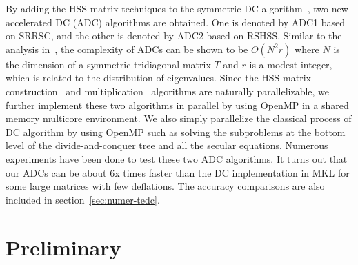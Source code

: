 \documentclass[times]{nlaauth}
\newcounter{algorithm}
\begin{document}
  By adding the HSS matrix techniques to the symmetric DC algorithm~\cite{Cuppen81,Rutter94,Gu-eigenvalue},
  two new accelerated DC (ADC) algorithms are obtained. One is denoted by {ADC1} based on SRRSC,
  and the other is denoted by {ADC2} based on RSHSS.
Similar to the analysis in~\cite{Demmel-book}, the complexity of
  ADCs can be shown to be $O(N^2 r)$ where $N$ is the dimension of a symmetric tridiagonal matrix $T$
  and $r$ is a modest integer, which is related to the distribution of eigenvalues.
  Since the HSS matrix construction~\cite{Hss-ulv,rand-hss,Sherry-PHss}
  and multiplication~\cite{Lyons-thesis} algorithms are naturally parallelizable,
  we further implement these two algorithms in parallel by using OpenMP in a shared
  memory multicore environment.
  We also simply parallelize the classical process of DC algorithm by using OpenMP such
  as solving the subproblems at the bottom level of the divide-and-conquer tree and all the secular equations.
  Numerous experiments have been done to test these two ADC algorithms.
  It turns out that our ADCs can be about 6x times faster than the DC implementation in MKL for some large matrices with few deflations.
  The accuracy comparisons are also included in section~\ref{sec:numer-tedc}.

\section{Preliminary}
\label{sec:notation}
\end{document}
